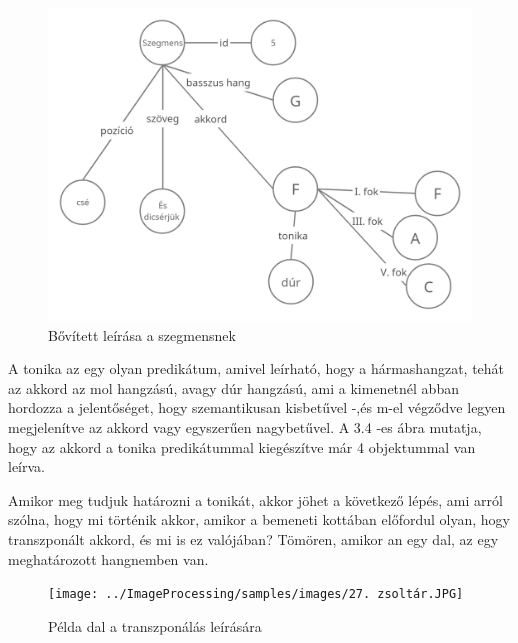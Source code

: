 \begin{figure}[h]
	\includegraphics[scale=0.3]{images/rdf_graph_4.png}
	\caption{Bővített leírása a szegmensnek}
	\label{fig:graph4}
\end{figure}
A tonika az egy olyan predikátum, amivel leírható, hogy a hármashangzat, tehát az akkord az mol hangzású, avagy dúr hangzású, ami a kimenetnél abban hordozza a jelentőséget, hogy szemantikusan kisbetűvel -,és m-el végződve legyen megjelenítve az akkord vagy egyszerűen nagybetűvel. A 3.4 -es ábra mutatja, hogy az akkord a tonika predikátummal kiegészítve már 4 objektummal van leírva.
\par
Amikor meg tudjuk határozni a tonikát, akkor jöhet a következő lépés, ami arról szólna, hogy mi történik akkor, amikor a bemeneti kottában előfordul olyan, hogy transzponált akkord, és mi is ez valójában? Tömören, amikor an egy dal, az egy meghatározott hangnemben van.
\newpage
\begin{figure}[h]
	\texttt{[image: ../ImageProcessing/samples/images/27. zsoltár.JPG]}
	\caption{Példa dal a transzponálás leírására}
	\label{fig:song1}
\end{figure}
\newpage
